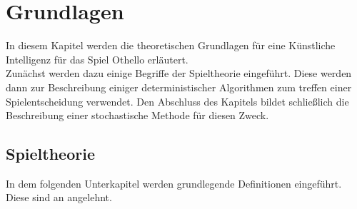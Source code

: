 \chapter{Grundlagen}
In diesem Kapitel werden die theoretischen Grundlagen für eine Künstliche Intelligenz für das Spiel Othello erläutert.\\
Zunächst werden dazu einige Begriffe der Spieltheorie eingeführt. Diese werden dann zur Beschreibung einiger deterministischer Algorithmen zum treffen einer Spielentscheidung verwendet. Den Abschluss des Kapitels bildet schließlich die Beschreibung einer stochastische Methode für diesen Zweck. 
\section{Spieltheorie}
In dem folgenden Unterkapitel werden grundlegende Definitionen eingeführt. Diese sind an \cite{Russell.2016} angelehnt.
